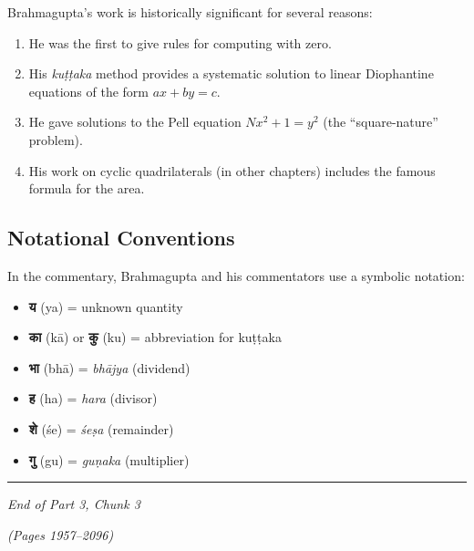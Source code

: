 \documentclass[11pt,a4paper]{article}
\newcommand{\shortline}{\noindent\rule{0.5\textwidth}{0.4pt}\par}
\begin{document}
Brahmagupta's work is historically significant for several reasons:

\begin{enumerate}
  \item He was the first to give rules for computing with zero.
  \item His \textit{kuṭṭaka} method provides a systematic solution to linear Diophantine equations of the form $ax + by = c$.
  \item He gave solutions to the Pell equation $Nx^2 + 1 = y^2$ (the ``square-nature'' problem).
  \item His work on cyclic quadrilaterals (in other chapters) includes the famous formula for the area.
\end{enumerate}

\subsection*{Notational Conventions}

In the commentary, Brahmagupta and his commentators use a symbolic notation:
\begin{itemize}
  \item \textbf{य} (ya) = unknown quantity
  \item \textbf{का} (kā) or \textbf{कु} (ku) = abbreviation for kuṭṭaka
  \item \textbf{भा} (bhā) = \textit{bhājya} (dividend)
  \item \textbf{ह} (ha) = \textit{hara} (divisor)
  \item \textbf{शे} (śe) = \textit{śeṣa} (remainder)
  \item \textbf{गु} (gu) = \textit{guṇaka} (multiplier)
\end{itemize}

\vspace{2em}
\begin{center}
\shortline

\textit{End of Part 3, Chunk 3}

\textit{(Pages 1957–2096)}
\end{center}
\end{document}

